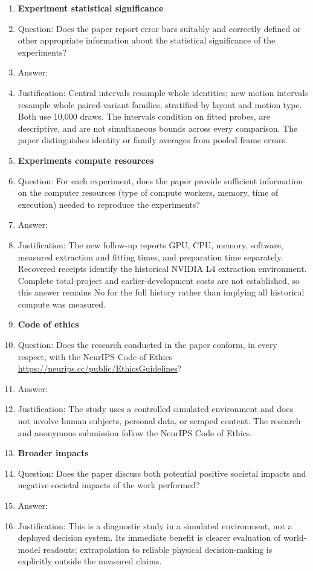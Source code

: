 \begin{enumerate}
\item {\bf Experiment statistical significance}
    \item[] Question: Does the paper report error bars suitably and correctly defined or other appropriate information about the statistical significance of the experiments?
    \item[] Answer: \answerYes{}
    \item[] Justification: Central intervals resample whole identities; new motion intervals resample whole paired-variant families, stratified by layout and motion type. Both use 10,000 draws. The intervals condition on fitted probes, are descriptive, and are not simultaneous bounds across every comparison. The paper distinguishes identity or family averages from pooled frame errors.


\item {\bf Experiments compute resources}
    \item[] Question: For each experiment, does the paper provide sufficient information on the computer resources (type of compute workers, memory, time of execution) needed to reproduce the experiments?
    \item[] Answer: \answerNo{}
    \item[] Justification: The new follow-up reports GPU, CPU, memory, software, measured extraction and fitting times, and preparation time separately. Recovered receipts identify the historical NVIDIA L4 extraction environment. Complete total-project and earlier-development costs are not established, so this answer remains No for the full history rather than implying all historical compute was measured.


\item {\bf Code of ethics}
    \item[] Question: Does the research conducted in the paper conform, in every respect, with the NeurIPS Code of Ethics \url{https://neurips.cc/public/EthicsGuidelines}?
    \item[] Answer: \answerYes{}
    \item[] Justification: The study uses a controlled simulated environment and does not involve human subjects, personal data, or scraped content. The research and anonymous submission follow the NeurIPS Code of Ethics.


\item {\bf Broader impacts}
    \item[] Question: Does the paper discuss both potential positive societal impacts and negative societal impacts of the work performed?
    \item[] Answer: \answerNA{}
    \item[] Justification: This is a diagnostic study in a simulated environment, not a deployed decision system. Its immediate benefit is clearer evaluation of world-model readouts; extrapolation to reliable physical decision-making is explicitly outside the measured claims.



\end{enumerate}
